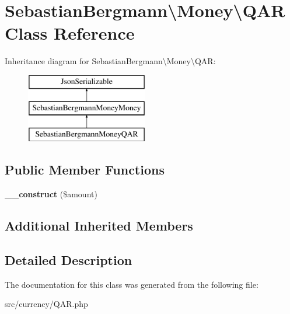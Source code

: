 \hypertarget{classSebastianBergmann_1_1Money_1_1QAR}{}\section{Sebastian\+Bergmann\textbackslash{}Money\textbackslash{}Q\+A\+R Class Reference}
\label{classSebastianBergmann_1_1Money_1_1QAR}
Inheritance diagram for Sebastian\+Bergmann\textbackslash{}Money\textbackslash{}Q\+A\+R\+:\begin{figure}[H]
\begin{center}
\leavevmode
\includegraphics[height=3.000000cm]{classSebastianBergmann_1_1Money_1_1QAR}
\end{center}
\end{figure}
\subsection*{Public Member Functions}
\begin{DoxyCompactItemize}
\item 
\hypertarget{classSebastianBergmann_1_1Money_1_1QAR_a89cc7bbd8399b789787a6ca28dc9896c}{}{\bfseries \+\_\+\+\_\+construct} (\$amount)\label{classSebastianBergmann_1_1Money_1_1QAR_a89cc7bbd8399b789787a6ca28dc9896c}

\end{DoxyCompactItemize}
\subsection*{Additional Inherited Members}


\subsection{Detailed Description}


The documentation for this class was generated from the following file\+:\begin{DoxyCompactItemize}
\item 
src/currency/Q\+A\+R.\+php\end{DoxyCompactItemize}
